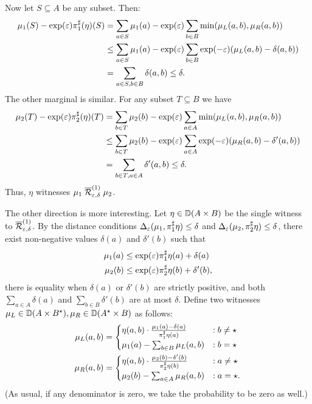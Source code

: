 \documentclass{lmcs}
\begin{document}
  Now let $S \subseteq A$ be any subset. Then:
  \begin{align*}
    \mu_1(S) - \exp(\varepsilon) \pi_{1}^{\sharp}(\eta)(S)
    &= \sum_{a \in S} \mu_1(a) - \exp(\varepsilon) \sum_{b \in B} \min(\mu_L(a, b), \mu_R(a, b)) \\
    &\leq \sum_{a \in S} \mu_1(a) - \exp(\varepsilon)
    \sum_{b \in B} \exp(-\varepsilon) (\mu_L(a, b) - \delta(a, b)) \\
    &= \sum_{a \in S, b \in B} \delta(a, b) \leq \delta .
  \end{align*}
  The other marginal is similar. For any subset $T \subseteq B$ we have
  \begin{align*}
    \mu_2(T) - \exp(\varepsilon) \pi_{2}^{\sharp}(\eta)(T)
    &= \sum_{b \in T} \mu_2(b) - \exp(\varepsilon) \sum_{a \in A} \min(\mu_L(a, b), \mu_R(a, b)) \\
    &\leq \sum_{b \in T} \mu_2(b) - \exp(\varepsilon)
    \sum_{a \in A} \exp(-\varepsilon) (\mu_R(a, b) - \delta'(a, b)) \\
    &= \sum_{b \in T, a \in A} \delta'(a, b) \leq \delta .
  \end{align*}
  Thus, $\eta$ witnesses $\mu_1 \mathrel{\overline{\mathrel{\mathcal{R}}}^{(1)}_{\varepsilon, \delta}} \mu_2$.

  The other direction is more interesting. Let $\eta \in {\mathbb{D}}(A \times B)$ be
  the single witness to $\mathrel{\overline{\mathrel{\mathcal{R}}}^{(1)}_{\varepsilon,\delta}}$.  By the
  distance conditions $\Delta_{\varepsilon}(\mu_1,\pi_{1}^{\sharp} \eta) \leq \delta$ and
  $\Delta_{\varepsilon}(\mu_2,\pi_{2}^{\sharp} \eta) \leq \delta$, there exist non-negative
  values $\delta(a)$ and $\delta'(b)$ such that
  \begin{align*}
    \mu_1(a) &\leq \exp(\varepsilon) \pi_{1}^{\sharp} \eta(a) + \delta(a) \\
    \mu_2(b) &\leq \exp(\varepsilon) \pi_{2}^{\sharp} \eta(b) + \delta'(b) ,
  \end{align*}
  there is equality when $\delta(a)$ or $\delta'(b)$ are strictly positive, and
  both $\sum_{a \in A} \delta(a)$ and $\sum_{b \in B} \delta'(b)$ are at
  most $\delta$. Define two witnesses $\mu_L \in {\mathbb{D}}(A \times B^\star), \mu_R
  \in {\mathbb{D}}(A^\star \times B)$ as follows:
  \begin{align*}
    \mu_L(a, b) &=
    \begin{cases}
      \eta(a, b) \cdot \frac{\mu_1(a) - \delta(a)}{\pi_{1}^{\sharp}\eta(a)}
      &: b \neq \star \\
      \mu_1(a) - \sum_{b \in B} \mu_L(a, b)
      &: b = \star
    \end{cases}
    \\
    \mu_R(a, b) &=
    \begin{cases}
      \eta(a, b) \cdot \frac{\mu_2(b) - \delta'(b)}{\pi_{2}^{\sharp}\eta(b)}
      &: a \neq \star \\
      \mu_2(b) - \sum_{a \in A} \mu_R(a, b)
      &: a = \star .
    \end{cases}
  \end{align*}
  (As usual, if any denominator is zero, we take the probability to be zero as
  well.)
  
\end{document}
